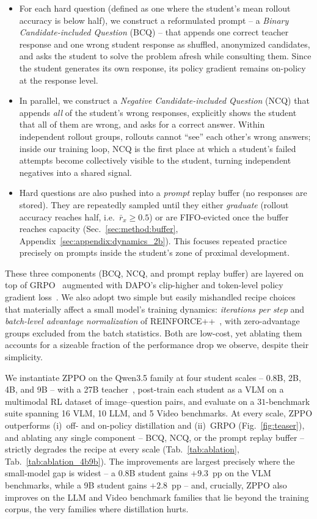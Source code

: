 \begin{itemize}[leftmargin=12pt,topsep=2pt,itemsep=2pt]
  \item For each hard question (defined as one where the student's mean rollout accuracy is below half), we construct a reformulated prompt -- a \emph{Binary Candidate-included Question} (BCQ) -- that appends one correct teacher response and one wrong student response as shuffled, anonymized candidates, and asks the student to solve the problem afresh while consulting them. Since the student generates its own response, its policy gradient remains on-policy at the response level.
  \item In parallel, we construct a \emph{Negative Candidate-included Question} (NCQ) that appends \emph{all} of the student's wrong responses, explicitly shows the student that all of them are wrong, and asks for a correct answer. Within independent rollout groups, rollouts cannot ``see'' each other's wrong answers; inside our training loop, NCQ is the first place at which a student's failed attempts become collectively visible to the student, turning independent negatives into a shared signal.
  \item Hard questions are also pushed into a \emph{prompt} replay buffer (no responses are stored). They are repeatedly sampled until they either \emph{graduate} (rollout accuracy reaches half, i.e.\ $\bar{r}_x\!\geq\!0.5$) or are FIFO-evicted once the buffer reaches capacity (Sec.~\ref{sec:method:buffer}, Appendix~\ref{sec:appendix:dynamics_2b}). This focuses repeated practice precisely on prompts inside the student's zone of proximal development.
\end{itemize}

These three components (BCQ, NCQ, and prompt replay buffer) are layered on top of GRPO~\citep{shao2024deepseekmath} augmented with DAPO's clip-higher and token-level policy gradient loss~\citep{yu2025dapo}. We also adopt two simple but easily mishandled recipe choices that materially affect a small model's training dynamics: \emph{iterations per step} and \emph{batch-level advantage normalization} of REINFORCE++~\citep{hu2025reinforce++}, with zero-advantage groups excluded from the batch statistics. Both are low-cost, yet ablating them accounts for a sizeable fraction of the performance drop we observe, despite their simplicity.

We instantiate ZPPO on the Qwen3.5 family at four student scales -- 0.8B, 2B, 4B, and 9B -- with a 27B teacher~\citep{qwen3.5}, post-train each student as a VLM on a multimodal RL dataset of image--question pairs, and evaluate on a $31$-benchmark suite spanning 16 VLM, 10 LLM, and 5 Video benchmarks. At every scale, ZPPO outperforms (i)~off- and on-policy distillation and (ii)~GRPO (Fig.~\ref{fig:teaser}), and ablating any single component -- BCQ, NCQ, or the prompt replay buffer -- strictly degrades the recipe at every scale (Tab.~\ref{tab:ablation}, Tab.~\ref{tab:ablation_4b9b}). The improvements are largest precisely where the small-model gap is widest -- a 0.8B student gains $+9.3$~pp on the VLM benchmarks, while a 9B student gains $+2.8$~pp -- and, crucially, ZPPO also improves on the LLM and Video benchmark families that lie beyond the training corpus, the very families where distillation hurts.

